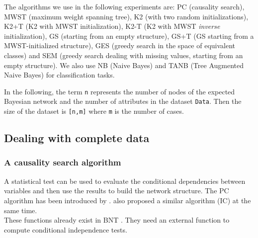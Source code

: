 The algorithms we use in the following experiments are:  PC (causality search), MWST (maximum weight spanning tree), K2 (with two random initializations), K2+T (K2 with MWST initialization), K2-T (K2 with MWST \textit{inverse} initialization), GS (starting from an empty structure), GS+T (GS starting from a MWST-initialized structure), GES (greedy search in the space of equivalent classes) and SEM (greedy search dealing with missing values, starting from an empty structure). We also use NB (Naive Bayes) and TANB (Tree Augmented Naive Bayes) for classification tasks.

In the following, the term \texttt{n} represents the number of nodes of the expected Bayesian network and the number of attributes in the dataset \texttt{Data}.
Then the size of the dataset is \texttt{[n,m]} where \texttt{m} is the number of cases.

\subsection{Dealing with complete data}

\subsubsection{A causality search algorithm}

A statistical test can be used to evaluate the conditional dependencies between variables and then use the results to build the network structure.
The PC algorithm has been introduced by \cite{Spi00}. \cite{Pea91} also proposed a similar algorithm (IC) at the same time.\\
These functions already exist in BNT \cite{BNT04}.
They need an external function to compute conditional independence tests.
\vspace*{-1\baselineskip}

